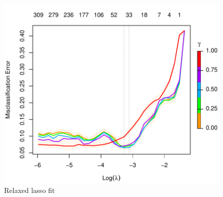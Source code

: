 \documentclass[
]{book}
\begin{document}
\begin{figure}
\centering
\includegraphics{Static/figures/hcc5hmC-glmnetFit-lookLassoR-1.pdf}
\caption{\label{fig:hcc5hmC-glmnetFit-lookLassoR}Relaxed lasso fit}
\end{figure}
\end{document}
